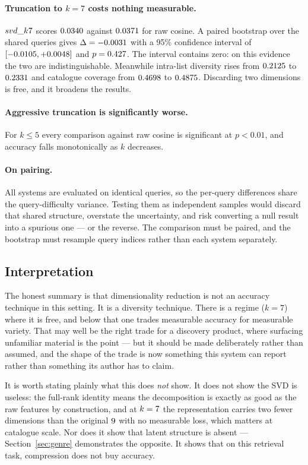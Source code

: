 \documentclass[11pt]{article}
\begin{document}
\paragraph{Truncation to $k=7$ costs nothing measurable.} $svd\_k7$ scores
$0.0340$ against $0.0371$ for raw cosine. A paired bootstrap over the
shared queries gives $\Delta = -0.0031$ with a 95\% confidence interval
of $[-0.0105, +0.0048]$ and $p = 0.427$. The interval contains
zero: on this evidence the two are indistinguishable. Meanwhile intra-list
diversity rises from $0.2125$ to $0.2331$ and catalogue
coverage from $0.4698$ to $0.4875$. Discarding two dimensions
is free, and it broadens the results.

\paragraph{Aggressive truncation is significantly worse.} For $k \leq 5$ every
comparison against raw cosine is significant at $p < 0.01$, and accuracy falls
monotonically as $k$ decreases.

\paragraph{On pairing.} All systems are evaluated on identical queries, so the
per-query differences share the query-difficulty variance. Testing them as
independent samples would discard that shared structure, overstate the
uncertainty, and risk converting a null result into a spurious one --- or the
reverse. The comparison must be paired, and the bootstrap must resample query
indices rather than each system separately.

\subsection{Interpretation}

The honest summary is that dimensionality reduction is not an accuracy
technique in this setting. It is a diversity technique. There is a regime
($k=7$) where it is free, and below that one trades measurable accuracy for
measurable variety. That may well be the right trade for a discovery product,
where surfacing unfamiliar material is the point --- but it should be made
deliberately rather than assumed, and the shape of the trade is now something
this system can report rather than something its author has to claim.

It is worth stating plainly what this does \emph{not} show. It does not show
the SVD is useless: the full-rank identity means the decomposition is exactly
as good as the raw features by construction, and at $k=7$ the
representation carries two fewer dimensions than the original $9$
with no measurable loss, which matters at catalogue scale. Nor does it show
that latent structure is absent --- Section~\ref{sec:genre} demonstrates the
opposite. It shows that on this retrieval task, compression does not buy
accuracy.
\end{document}

